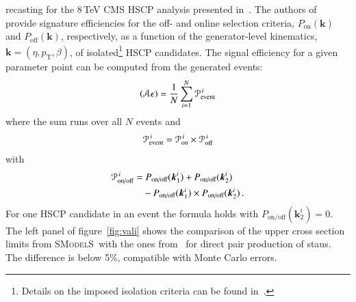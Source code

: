\documentclass[preprint,number,sort&compress,twocolumn,3p]{elsstyarticle}
\renewcommand{\vec}[1]{\boldsymbol{#1}}
\newcommand{\smo}{\textsc{SModelS}}
\begin{document}
\begin{appendix}
recasting for the 8\,TeV CMS HSCP analysis presented in~\cite{Khachatryan:2015lla}. The authors of~\cite{Khachatryan:2015lla} provide
signature efficiencies for the off- and online selection criteria, $P_\text{on}(\vec{k})$ and $P_\text{off}(\vec{k})$, respectively, as a function of the generator-level kinematics, $\vec{k}=(\eta,p_\text{T},\beta)$, of isolated\footnote{Details on the imposed isolation criteria can be found in~\cite{Khachatryan:2015lla,Heisig:2015yla}.} HSCP candidates.
The signal efficiency for a given parameter point can be computed from the generated events:
\begin{equation}
\label{eq:signaleff}
({\cal A}\epsilon) = \frac{1}{N}\sum_{i=1}^N {\cal P}^{\,i}_\text{event} 
\end{equation}
where the sum runs over all $N$ events and
\begin{equation}
\label{eq:pevent}
{\cal P}^{\,i}_\text{event} ={\cal P}^{\,i}_\text{on}\times {\cal P}^{\,i}_\text{off}
\end{equation}
with
\begin{equation}
\begin{split}
{\cal P}^{\,i}_\text{on/off} = &\;P_\text{on/off}(\vec{k}_1^i) + P_\text{on/off}(\vec{k}_2^i)\\
& - P_\text{on/off}(\vec{k}_1^i)\times P_\text{on/off}(\vec{k}_2^i)\,.
\end{split}
\end{equation}
For one HSCP candidate in an event the formula holds with $P_\text{on/off}(\vec{k}_2^i)=0$.
The left panel of figure~\ref{fig:vali} shows the comparison of the upper cross section limits from \smo\ with the
ones from~\cite{Khachatryan:2015lla} for direct pair production of staus. The difference is below
5\%, compatible with Monte Carlo errors.




\end{appendix}
\end{document}
